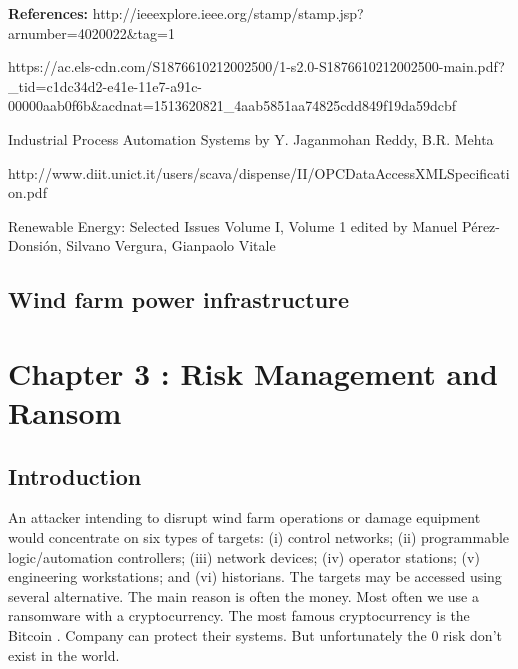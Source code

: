 \documentclass[twosided,a4,10pt]{article}
\begin{document}
\begin{multicols}{2}
	\textbf{References:} \newline
	http://ieeexplore.ieee.org/stamp/stamp.jsp?arnumber=4020022\&tag=1 \newline
	
	https://ac.els-cdn.com/S1876610212002500/1-s2.0-S1876610212002500-main.pdf?\_tid=c1dc34d2-e41e-11e7-a91c-00000aab0f6b\&acdnat=1513620821\_4aab5851aa74825cdd849f19da59dcbf 
	\newline
	
	Industrial Process Automation Systems by Y. Jaganmohan Reddy, B.R. Mehta
	\newline
	
	http://www.diit.unict.it/users/scava/dispense/II/OPCDataAccessXMLSpecification.pdf
	\newline
	
	Renewable Energy: Selected Issues Volume I, Volume 1
	edited by Manuel Pérez-Donsión, Silvano Vergura, Gianpaolo Vitale
	
 \subsection{Wind farm power infrastructure}
  \lipsum[1]

\section{Chapter 3 : Risk Management and Ransom } 
\subsection{Introduction}
An attacker intending to disrupt wind farm operations or damage equipment would concentrate on six types of targets: (i) control networks; (ii) programmable logic/automation controllers; (iii) network devices; (iv) operator stations; (v) engineering workstations; and (vi) historians. The targets may be accessed using several alternative. The main reason is often the money. Most often we use a ransomware with a cryptocurrency. The most famous cryptocurrency is the Bitcoin . Company can protect their systems. But unfortunately the 0 risk don't exist in the world.


\end{multicols}
\end{document}
